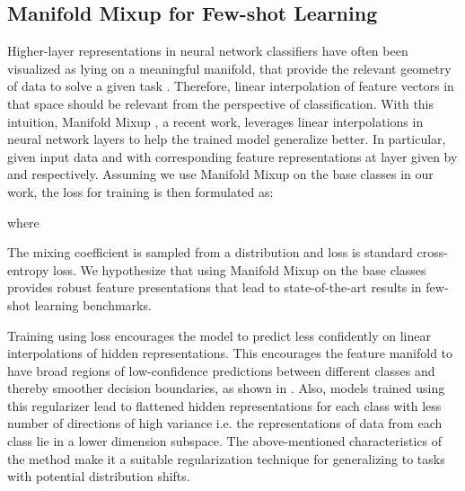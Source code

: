 \documentclass[10pt,twocolumn,letterpaper]{article}
\begin{document}
\subsection{Manifold Mixup for Few-shot Learning}
Higher-layer representations in neural network classifiers have often been visualized as lying on a meaningful manifold, that provide the relevant geometry of data to solve a given task \cite{bengio2013representation}. Therefore, linear interpolation of feature vectors in that space should be relevant from the perspective of classification. With this intuition, Manifold Mixup \cite{verma2019manifold}, a recent work, leverages linear interpolations in neural network layers to help the trained model generalize better.
In particular, given input data  and  with corresponding feature representations at layer  given by  and  respectively. Assuming we use Manifold Mixup on the base classes in our work, the loss for training  is then formulated as:

where 

The mixing coefficient  is sampled from a  distribution and loss  is standard cross-entropy loss. We hypothesize that using Manifold Mixup on the base classes provides robust feature presentations that lead to state-of-the-art results in few-shot learning benchmarks.

Training using loss  encourages the model to predict less confidently on linear interpolations of hidden representations. This encourages the feature manifold to have broad regions of low-confidence predictions between different classes and thereby smoother decision boundaries, as shown in \cite{verma2019manifold}. Also, models trained using this regularizer lead to flattened hidden representations for each class with less number of directions of high variance i.e. the representations of data from each class lie in a lower dimension subspace. The above-mentioned characteristics of the method make it a suitable regularization technique for generalizing to tasks with potential distribution shifts.
\end{document}
